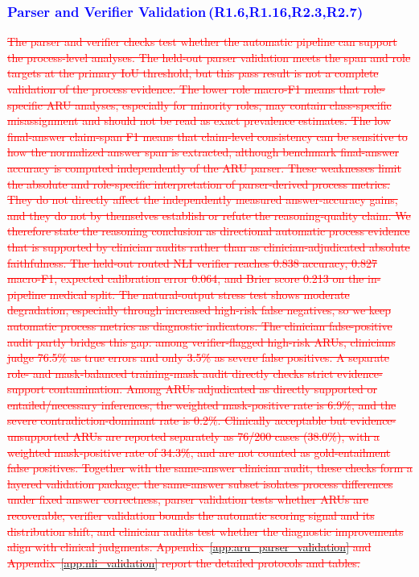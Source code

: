 \documentclass[a4paper,fleqn,doubleblind]{cas-sc}
\DeclareRobustCommand{\deleted}[1]{\textcolor{red}{\sout{#1}}}
\DeclareRobustCommand{\added}[1]{\textcolor{blue}{#1}}
\DeclareRobustCommand{\revtag}[1]{\textcolor{blue}{\scriptsize\,(\textbf{#1})}}
\begin{document}
\subsubsection{\added{Parser and Verifier Validation}\revtag{R1.6,R1.16,R2.3,R2.7}}
\label{subsec:aru_parser_validation}
\label{subsec:verifier_validation}

\deleted{The parser and verifier checks test whether the automatic pipeline can support the process-level analyses. The held-out parser validation meets the span and role targets at the primary IoU threshold, but this pass result is not a complete validation of the process evidence. The lower role macro-F1 means that role-specific ARU analyses, especially for minority roles, may contain class-specific misassignment and should not be read as exact prevalence estimates. The low final-answer claim-span F1 means that claim-level consistency can be sensitive to how the normalized answer span is extracted, although benchmark final-answer accuracy is computed independently of the ARU parser. These weaknesses limit the absolute and role-specific interpretation of parser-derived process metrics. They do not directly affect the independently measured answer-accuracy gains, and they do not by themselves establish or refute the reasoning-quality claim. We therefore state the reasoning conclusion as directional automatic process evidence that is supported by clinician audits rather than as clinician-adjudicated absolute faithfulness. The held-out routed NLI verifier reaches 0.838 accuracy, 0.827 macro-F1, expected calibration error 0.064, and Brier score 0.213 on the in-pipeline medical split. The natural-output stress test shows moderate degradation, especially through increased high-risk false negatives, so we keep automatic process metrics as diagnostic indicators. The clinician false-positive audit partly bridges this gap: among verifier-flagged high-risk ARUs, clinicians judge 76.5\% as true errors and only 3.5\% as severe false positives. A separate role- and mask-balanced training-mask audit directly checks strict evidence-support contamination. Among ARUs adjudicated as directly supported or entailed/necessary inferences, the weighted mask-positive rate is 6.9\%, and the severe contradiction-dominant rate is 0.2\%. Clinically acceptable but evidence-unsupported ARUs are reported separately as 76/200 cases (38.0\%), with a weighted mask-positive rate of 34.3\%, and are not counted as gold-entailment false positives. Together with the same-answer clinician audit, these checks form a layered validation package: the same-answer subset isolates process differences under fixed answer correctness, parser validation tests whether ARUs are recoverable, verifier validation bounds the automatic scoring signal and its distribution shift, and clinician audits test whether the diagnostic improvements align with clinical judgments. Appendix~\ref{app:aru_parser_validation} and Appendix~\ref{app:nli_validation} report the detailed protocols and tables.}
\end{document}
